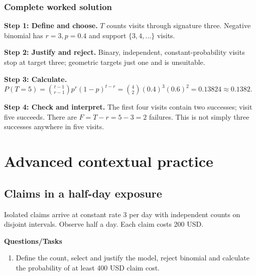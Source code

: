 \subsubsection*{Complete worked solution}
\par\noindent\begin{minipage}{\linewidth}
\textbf{Step 1: Define and choose.} $T$ counts visits through signature three. Negative binomial has $r=3,p=0.4$ and support $\{3,4,\ldots\}$ visits.
\end{minipage}\par\medskip
\par\noindent\begin{minipage}{\linewidth}
\textbf{Step 2: Justify and reject.} Binary, independent, constant-probability visits stop at target three; geometric targets just one and is unsuitable.
\end{minipage}\par\medskip
\par\noindent\begin{minipage}{\linewidth}
\textbf{Step 3: Calculate.} $P(T=5)=\binom{t-1}{r-1}p^r(1-p)^{t-r}=\binom42(0.4)^3(0.6)^2=0.13824\approx0.1382$.
\end{minipage}\par\medskip
\par\noindent\begin{minipage}{\linewidth}
\textbf{Step 4: Check and interpret.} The first four visits contain two successes; visit five succeeds. There are $F=T-r=5-3=2$ failures. This is not simply three successes anywhere in five visits.
\end{minipage}\par\medskip
{}
\section{Advanced contextual practice}\label{sec:t2-c9-advanced}
\subsection{Claims in a half-day exposure}
Isolated claims arrive at constant rate 3 per day with independent counts on disjoint intervals. Observe half a day. Each claim costs 200 USD.

\textbf{Questions/Tasks}
\begin{enumerate}
\item Define the count, select and justify the model, reject binomial and calculate the probability of at least 400 USD claim cost.
\end{enumerate}
